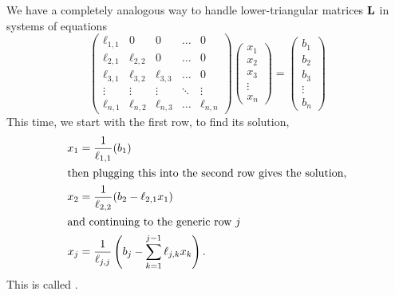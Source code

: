 \M
We have a completely analogous way to handle lower-triangular matrices
$\mathbf{L}$ in systems of equations
\begin{equation}
\begin{pmatrix}
  \ell_{1,1} &  0        & 0         & \dots & 0\\
  \ell_{2,1} & \ell_{2,2} & 0         & \dots & 0\\
  \ell_{3,1} & \ell_{3,2} & \ell_{3,3} & \dots & 0\\
  \vdots    & \vdots    & \vdots     & \ddots & \vdots\\
  \ell_{n,1} & \ell_{n,2} & \ell_{n,3} & \dots & \ell_{n,n}
\end{pmatrix}
\begin{pmatrix}x_{1}\\x_{2}\\x_{3}\\\vdots\\x_{n}
\end{pmatrix}
=\begin{pmatrix}b_{1}\\b_{2}\\b_{3}\\\vdots\\b_{n}
\end{pmatrix}
\end{equation}
This time, we start with the first row, to find its solution,
\begin{subequations}
\begin{align}
x_{1} &= \frac{1}{\ell_{1,1}}(b_{1})\\
\intertext{then plugging this into the second row gives the solution,}
x_{2} &= \frac{1}{\ell_{2,2}}(b_{2} - \ell_{2,1}x_{1})\\
\intertext{and continuing to the generic row $j$}
x_{j} &= \frac{1}{\ell_{j,j}}\left(b_{j} - \sum^{j-1}_{k=1}\ell_{j,k}x_{k}\right).
\end{align}
\end{subequations}
This is called .


